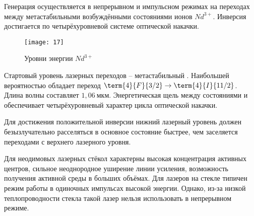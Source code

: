 Генерация осуществляется в непрерывном и импульсном режимах на переходах между 
метастабильными возбуждёнными состояниями ионов \( Nd^{3+} \). Инверсия 
достигается по четырёхуровневой системе оптической накачки.

\begin{figure}[h]
    \center
    \texttt{[image: 17]}
    \caption{Уровни энергии \( Nd^{3+} \)}
\end{figure}

Стартовый уровень лазерных переходов -- метастабильный .
Наибольшей вероятностью обладает переход \( \term{4}{F}{3/2} \rightarrow
\term{4}{I}{11/2} \). Длина волны составляет \( 1,06~\text{мкм} \).
Энергетическая щель между состояниями  и 
обеспечивает четырёхуровневый характер цикла оптической накачки.

Для достижения положительной инверсии нижний лазерный уровень должен
безызлучательно расселяться в основное состояние быстрее, чем заселяется
переходами с верхнего лазерного уровня.

Для неодимовых лазерных стёкол характерны высокая концентрация активных 
центров, сильное неоднородное уширение линии усиления, возможность получения 
активной среды в больших объёмах. Для лазеров на стекле типичен режим работы 
в одиночных импульсах высокой энергии. Однако, из-за низкой теплопроводности 
стекла такой лазер нельзя использовать в непрерывном режиме.
